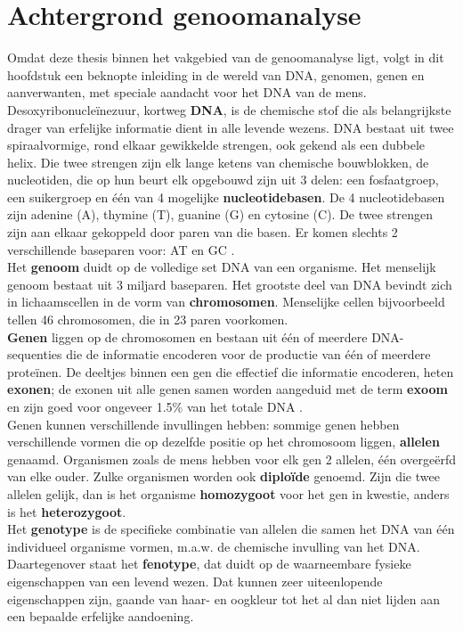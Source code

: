 \chapter{Achtergrond genoomanalyse}
\label{dna_dummies}

Omdat deze thesis binnen het vakgebied van de genoomanalyse ligt, volgt in dit hoofdstuk een beknopte inleiding in de wereld van DNA, genomen, genen en aanverwanten, met speciale aandacht voor het DNA van de mens.\\

Desoxyribonucle\"inezuur, kortweg \textbf{DNA}, is de chemische stof die als belangrijkste drager van erfelijke informatie dient in alle levende wezens. DNA bestaat uit twee spiraalvormige, rond elkaar gewikkelde strengen, ook gekend als een dubbele helix. Die twee strengen zijn elk lange ketens van chemische bouwblokken, de nucleotiden, die op hun beurt elk opgebouwd zijn uit 3 delen: een fosfaatgroep, een suikergroep en \'e\'en van 4 mogelijke \textbf{nucleotidebasen}. De 4 nucleotidebasen zijn adenine (A), thymine (T), guanine (G) en cytosine (C). De twee strengen zijn aan elkaar gekoppeld door paren van die basen. Er komen slechts 2 verschillende baseparen voor: AT en GC \cite{genome_gov} \cite{nature_scitable}.\\

Het \textbf{genoom} duidt op de volledige set DNA van een organisme. Het menselijk genoom bestaat uit 3 miljard baseparen. Het grootste deel van DNA bevindt zich in lichaamscellen in de vorm van \textbf{chromosomen}. Menselijke cellen bijvoorbeeld tellen 46 chromosomen, die in 23 paren voorkomen.\\
\textbf{Genen} liggen op de chromosomen en bestaan uit \'e\'en of meerdere DNA-sequenties die de informatie encoderen voor de productie van \'e\'en of meerdere prote\"inen. De deeltjes binnen een gen die effectief die informatie encoderen, heten \textbf{exonen}; de exonen uit alle genen samen worden aangeduid met de term \textbf{exoom} en zijn goed voor ongeveer 1.5\% van het totale DNA \cite{broad_exome}.\\
Genen kunnen verschillende invullingen hebben: sommige genen hebben verschillende vormen die op dezelfde positie op het chromosoom liggen, \textbf{allelen} genaamd. Organismen zoals de mens hebben voor elk gen 2 allelen, \'e\'en overge\"erfd van elke ouder. Zulke organismen worden ook \textbf{diplo\"ide} genoemd. Zijn die twee allelen gelijk, dan is het organisme \textbf{homozygoot} voor het gen in kwestie, anders is het \textbf{heterozygoot}.\\
Het \textbf{genotype} is de specifieke combinatie van allelen die samen het DNA van \'e\'en individueel organisme vormen, m.a.w. de chemische invulling van het DNA. Daartegenover staat het \textbf{fenotype}, dat duidt op de waarneembare fysieke eigenschappen van een levend wezen. Dat kunnen zeer uiteenlopende eigenschappen zijn, gaande van haar- en oogkleur tot het al dan niet lijden aan een bepaalde erfelijke aandoening.\\

